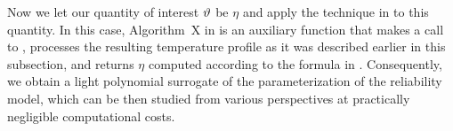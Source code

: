Now we let our quantity of interest $\vartheta$ be $\eta$ and apply the technique in  to this quantity.
In this case, Algorithm~X in  is an auxiliary function that makes a call to , processes the resulting temperature profile as it was described earlier in this subsection, and returns $\eta$ computed according to the formula in .
Consequently, we obtain a light polynomial surrogate of the parameterization of the reliability model, which can be then studied from various perspectives at practically negligible computational costs.
